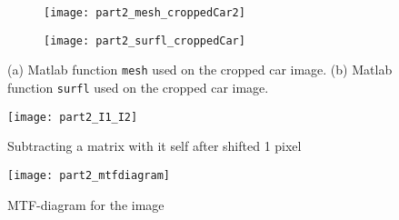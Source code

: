 \begin{figure}
\centering
	\begin{subfigure}[b]{0.4\textwidth}
		\texttt{[image: part2\_mesh\_croppedCar2]}
		\caption{}
		\label{fig:meshCar}
	\end{subfigure}
	\begin{subfigure}[b]{0.4\textwidth}	
		\texttt{[image: part2\_surfl\_croppedCar]}
		\caption{}
		\label{fig:surflCar}
	\end{subfigure}
	\caption{(a) Matlab function \texttt{mesh} used on the cropped car image. (b) Matlab function \texttt{surfl} used on the cropped car image. }
	\label{fig:part2}
\end{figure}
\begin{figure}
	\centering
	\texttt{[image: part2\_I1\_I2]}
	\caption{Subtracting a matrix with it self after shifted 1 pixel}
	\label{fig:I2_I1}
\end{figure}
\begin{figure}
	\centering
	\texttt{[image: part2\_mtfdiagram]}
	\caption{MTF-diagram for the image}
	\label{fig:mtf}
\end{figure}

